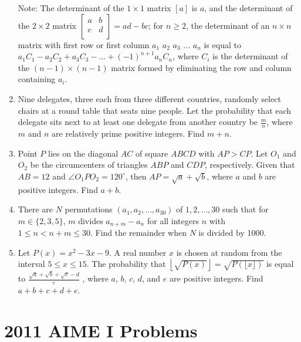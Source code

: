 \documentclass{article}
\begin{document}
\begin{enumerate}[label=\arabic*., itemsep=0.5em]
Note: The determinant of the \(1 \times 1\) matrix \([a]\) is \(a\), and the determinant of the \(2 \times 2\) matrix \(\left[ {\begin{array}{cc}
 a & b  \\
 c & d  \\
 \end{array} } \right] = ad - bc\); for \(n \ge 2\), the determinant of an \(n \times n\) matrix with first row or first column \(a_1\) \(a_2\) \(a_3\) \(\dots\) \(a_n\) is equal to \(a_1C_1 - a_2C_2 + a_3C_3 - \dots + (-1)^{n+1}a_nC_n\), where \(C_i\) is the determinant of the \((n - 1) \times (n - 1)\) matrix formed by eliminating the row and column containing \(a_i\).\par \vspace{0.5em}\item Nine delegates, three each from three different countries, randomly select chairs at a round table that seats nine people. Let the probability that each delegate sits next to at least one delegate from another country be \(\frac{m}{n}\), where \(m\) and \(n\) are relatively prime positive integers. Find \(m + n\).\par \vspace{0.5em}\item Point \(P\) lies on the diagonal \(AC\) of square \(ABCD\) with \(AP > CP\). Let \(O_1\) and \(O_2\) be the circumcenters of triangles \(ABP\) and \(CDP\), respectively. Given that \(AB = 12\) and \(\angle O_1PO_2 = 120 ^{\circ}\), then \(AP = \sqrt{a} + \sqrt{b}\), where \(a\) and \(b\) are positive integers. Find \(a + b\).\par \vspace{0.5em}\item There are \(N\) permutations \((a_1, a_2, \dots, a_{30})\) of \(1, 2, \dots, 30\) such that for \(m \in \{2,3,5\}\), \(m\) divides \(a_{n+m} - a_n\) for all integers \(n\) with \(1 \le n < n+m \le 30\). Find the remainder when \(N\) is divided by 1000.\par \vspace{0.5em}\item Let \(P(x) = x^2 - 3x - 9\). A real number \(x\) is chosen at random from the interval \(5 \le x \le 15\). The probability that \(\left\lfloor\sqrt{P(x)}\right\rfloor = \sqrt{P(\lfloor x \rfloor)}\) is equal to \(\frac{\sqrt{a} + \sqrt{b} + \sqrt{c} - d}{e}\) , where \(a\), \(b\), \(c\), \(d\), and \(e\) are positive integers. Find \(a + b + c + d + e\).\par \vspace{0.5em}
\end{enumerate}
\newpage\section*{2011 AIME I Problems}
\end{document}
